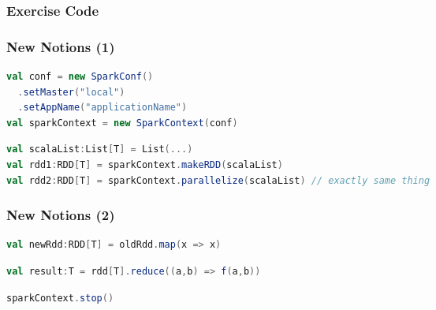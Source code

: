 \documentclass[slidetop,9pt,utf8]{beamer}
\begin{document}
\begin{CJK}{UTF8}{gbsn}
\begin{frame}
  \frametitle{Exercise Code}

  

\end{frame}

\begin{frame}[fragile]
  \frametitle{New Notions (1)}

  \begin{lstlisting}[label=InitSparkContext, caption=Init Spark Context, language=scala, style=code]
val conf = new SparkConf()
  .setMaster("local")
  .setAppName("applicationName")
val sparkContext = new SparkContext(conf)
  \end{lstlisting}

  \begin{lstlisting}[label=ListToRdd, caption=Load List as RDD, language=scala, style=code]
val scalaList:List[T] = List(...)
val rdd1:RDD[T] = sparkContext.makeRDD(scalaList)
val rdd2:RDD[T] = sparkContext.parallelize(scalaList) // exactly same thing
  \end{lstlisting}

\end{frame}

\begin{frame}[fragile]
  \frametitle{New Notions (2)}

  \begin{lstlisting}[label=RDDTransformation, caption=Apply transformation to RDD, language=scala, style=code]
val newRdd:RDD[T] = oldRdd.map(x => x)
  \end{lstlisting}

  \begin{lstlisting}[label=RDDAction, caption=Apply action to RDD, language=scala, style=code]
val result:T = rdd[T].reduce((a,b) => f(a,b))
  \end{lstlisting}

  \begin{lstlisting}[label=StopSparkContext, caption=Stop Spark Context, language=scala, style=code]
sparkContext.stop()
  \end{lstlisting}

\end{frame}


\end{CJK}
\end{document}
